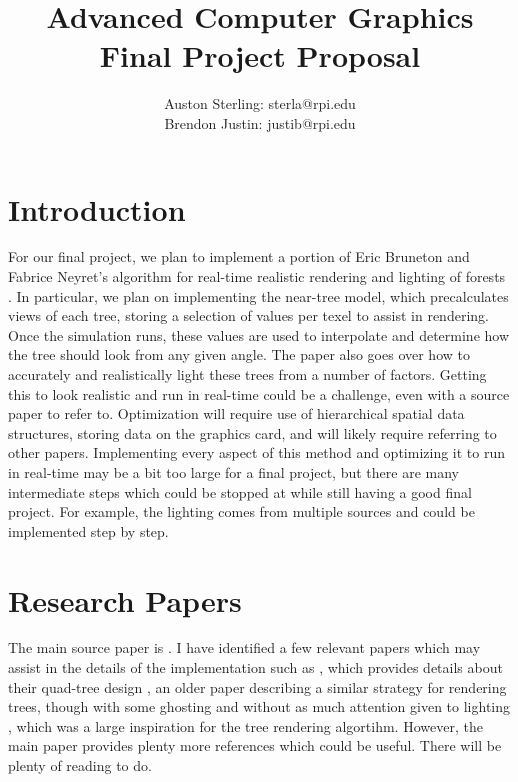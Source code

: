 \documentclass{article}
\begin{document}
\title{Advanced Computer Graphics Final Project Proposal}
\author{Auston Sterling: sterla@rpi.edu \\ Brendon Justin: justib@rpi.edu}
\date{}
\maketitle

\section{Introduction}
For our final project, we plan to implement a portion of Eric Bruneton and Fabrice Neyret's algorithm for real-time realistic rendering and lighting of forests \cite{trees}. In particular, we plan on implementing the near-tree model, which precalculates views of each tree, storing a selection of values per texel to assist in rendering. Once the simulation runs, these values are used to interpolate and determine how the tree should look from any given angle. The paper also goes over how to accurately and realistically light these trees from a number of factors. Getting this to look realistic and run in real-time could be a challenge, even with a source paper to refer to. Optimization will require use of hierarchical spatial data structures, storing data on the graphics card, and will likely require referring to other papers. Implementing every aspect of this method and optimizing it to run in real-time may be a bit too large for a final project, but there are many intermediate steps which could be stopped at while still having a good final project. For example, the lighting comes from multiple sources and could be implemented step by step.

\section{Research Papers}
The main source paper is \cite{trees}. I have identified a few relevant papers which may assist in the details of the implementation such as 
\cite{vecterrain}, which provides details about their quad-tree design \cite{treeszbuf}, an older paper describing a similar strategy for rendering trees, though with some ghosting and without as much attention given to lighting \cite{fastlightfield}, which was a large inspiration for the tree rendering algortihm.  However, the main paper provides plenty more references which could be useful. There will be plenty of reading to do.
\end{document}
